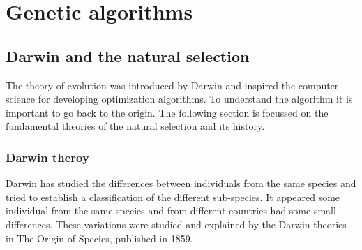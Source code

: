 \chapter{Genetic algorithms }\label{chap:EA}

\minitoc


\section{Darwin and the natural selection }

The theory of evolution was introduced by Darwin and inspired the computer science for developing optimization algorithms. To understand the algorithm it is important to go back to the origin.
The following  section is  focussed on the fundamental theories of the  natural selection and its history. 
\subsection{Darwin theroy } \label{sec:GA}

Darwin has studied the differences between individuals from the same species and tried to establish a classification of the different sub-species. It appeared some individual from the same species and from different countries had some small differences. These variations were studied and explained by the Darwin theories in The Origin of Species, published in 1859. 

